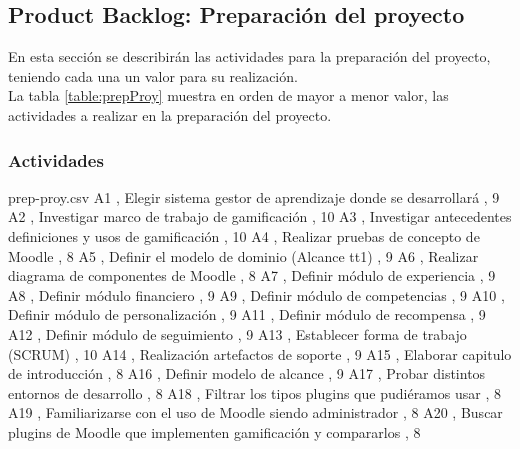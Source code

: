 \subsection{Product Backlog: Preparación del proyecto}

En esta sección se describirán las actividades para la preparación del proyecto, teniendo cada una un valor para su realización.\\

La tabla \ref{table:prepProy} muestra en orden de mayor a menor valor, las actividades a realizar en la preparación del proyecto.\\

\subsubsection{Actividades}

\begin{filecontents*}{prep-proy.csv}
 A1 , Elegir sistema gestor de aprendizaje donde se desarrollará , 9 
 A2 , Investigar marco de trabajo de gamificación , 10  
 A3 , Investigar antecedentes definiciones y usos de gamificación , 10 
 A4 , Realizar pruebas de concepto de Moodle , 8 
 A5 , Definir el modelo de dominio (Alcance tt1) , 9  
 A6 , Realizar diagrama de componentes de Moodle , 8  
 A7 , Definir módulo de experiencia , 9  
 A8 , Definir módulo financiero , 9 
 A9 , Definir módulo de competencias , 9 
 A10 , Definir módulo de personalización , 9 
 A11 , Definir módulo de recompensa , 9 
 A12 , Definir módulo de seguimiento , 9 
 A13 , Establecer forma de trabajo (SCRUM) , 10 
 A14 , Realización artefactos de soporte , 9 
 A15 , Elaborar capitulo de introducción , 8 
 A16 , Definir modelo de alcance , 9 
 A17 , Probar distintos entornos de desarrollo , 8 
 A18 , Filtrar los tipos plugins que pudiéramos usar , 8 
 A19 , Familiarizarse con el uso de Moodle siendo administrador , 8 
 A20 , Buscar plugins de Moodle que implementen gamificación y compararlos , 8 
\end{filecontents*}

